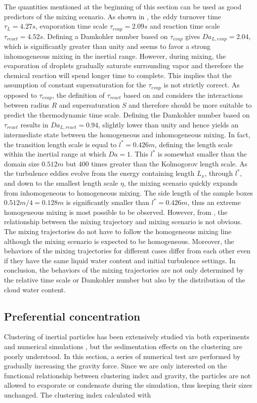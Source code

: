 The quantities mentioned at the beginning of this section can be used as good
predictors of the mixing scenario. As shown in , the eddy
turnover time $\tau_L = 4.27s$, evaporation time scale $\tau_{evap} = 2.09s$
and reaction time scale $\tau_{react} = 4.52s$. Defining a Damkohler number
based on $\tau_{evap}$ gives $Da_{L,evap} = 2.04$, which is significantly
greater than unity and seems to favor a strong inhomogeneous mixing in the
inertial range. However, during mixing, the evaporation of droplets gradually
saturate surrounding vapor and therefore the chemical reaction will spend
longer time to complete. This implies that the assumption of constant
supersaturation for the $\tau_{evap}$ is not strictly correct.  As opposed to
$\tau_{evap}$, the definition of $\tau_{react}$ based on  and
 considers the interactions between radius $R$ and
supersaturation $S$ and therefore should be more suitable to predict the
thermodynamic time scale. Defining the Damkohler number based on $\tau_{react}$
results in $Da_{L,react} = 0.94$, slightly lower than unity and hence yields an
intermediate state between the homogeneous and inhomogeneous mixing. In fact,
the transition length scale is equal to $l^{*} = 0.426m$, defining the length
scale within the inertial range at which $Da = 1$. This $l^*$ is somewhat
smaller than the domain size $0.512m$ but $400$ times greater than the
Kolmogorov length scale. As the turbulence eddies evolve from the energy
containing length $L_x$, through $l^*$, and down to the smallest length scale
$\eta$, the mixing scenario quickly expands from inhomogeneous to homogeneous
mixing. The side length of the sample boxes $0.512m/4 = 0.128 m$ is
significantly smaller than $l^* = 0.426m$, thus an extreme homogeneous mixing
is most possible to be observed. However, from , the
relationship between the mixing trajectory and mixing scenario is not obvious.
The mixing trajectories do not have to follow the homogeneous mixing line
although the mixing scenario is expected to be homogeneous. Moreover, the
behaviors of the mixing trajectories for different cases differ from each other
even if they have the same liquid water content and initial turbulence
settings. In conclusion, the behaviors of the mixing trajectories are not only
determined by the relative time scale or Damkohler number but also by the
distribution of the cloud water content.

\subsection{Preferential concentration}
Clustering of inertial particles has been extensively studied via both
experiments and numerical simulations \cite{Sundaram1997Collision, Reade2000Effect}, but the
sedimentation effects on the clustering are poorly understood. In this section,
a series of numerical test are performed by gradually increasing the gravity
force. Since we are only interested on the functional relationship between
clustering index and gravity, the particles are not allowed to evaporate or
condensate during the simulation, thus keeping their sizes unchanged.  The
clustering index calculated with \cite{Vaillancourt2002}

